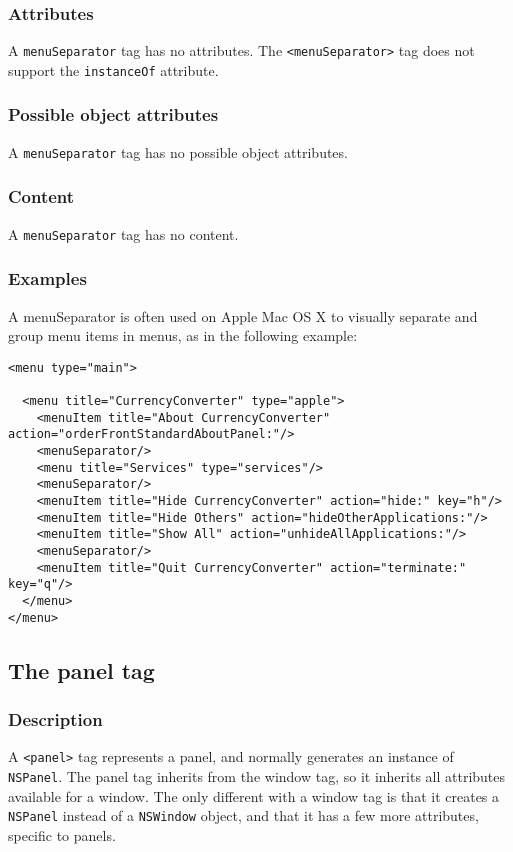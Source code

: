\subsubsection{Attributes}
A \texttt{menuSeparator} tag has no attributes.  The
\texttt{<menuSeparator>} tag does not support the \texttt{instanceOf}
attribute.

\subsubsection{Possible object attributes}
A \texttt{menuSeparator} tag has no possible object attributes.

\subsubsection{Content}
A \texttt{menuSeparator} tag has no content.

\subsubsection{Examples}
A menuSeparator is often used on Apple Mac OS X to visually separate and
group menu items in menus, as in the following example:
\begin{verbatim}
<menu type="main">

  <menu title="CurrencyConverter" type="apple">
    <menuItem title="About CurrencyConverter" action="orderFrontStandardAboutPanel:"/>
    <menuSeparator/>
    <menu title="Services" type="services"/>
    <menuSeparator/>
    <menuItem title="Hide CurrencyConverter" action="hide:" key="h"/>
    <menuItem title="Hide Others" action="hideOtherApplications:"/>
    <menuItem title="Show All" action="unhideAllApplications:"/>
    <menuSeparator/>
    <menuItem title="Quit CurrencyConverter" action="terminate:" key="q"/>
  </menu>
</menu>
\end{verbatim}

\subsection{The panel tag}

\subsubsection{Description}
A \texttt{<panel>} tag represents a panel, and normally generates an
instance of \texttt{NSPanel}.  The panel tag inherits from the window
tag, so it inherits all attributes available for a window.  The only
different with a window tag is that it creates a \texttt{NSPanel}
instead of a \texttt{NSWindow} object, and that it has a few more
attributes, specific to panels.


